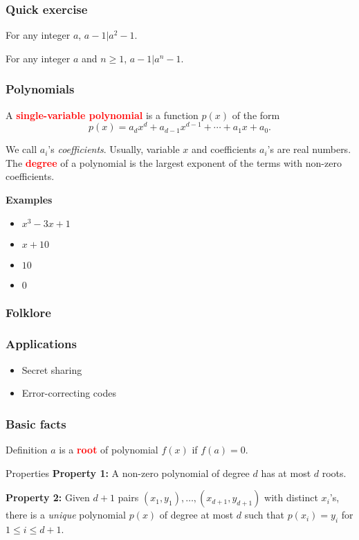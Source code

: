 

\begin{frame}
  \frametitle{Quick exercise} 

  For any integer $a$, $a-1|a^2-1$.

  \pause

  For any integer $a$ and $n\geq 1$, $a-1|a^n-1$.

  \vspace{3in}
\end{frame}

\begin{frame}
  \frametitle{Polynomials}

  A \textcolor{red}{\bf single-variable polynomial} is a function
  $p(x)$ of the form
  \[
  p(x) = a_dx^d+a_{d-1}x^{d-1}+\cdots+a_1x+a_0.
  \]

  We call $a_i$'s {\em coefficients}.  Usually, variable $x$ and
  coefficients $a_i$'s are real numbers.  The \textcolor{red}{\bf
    degree} of a polynomial is the largest exponent of the terms with
  non-zero coefficients.
  
  \vspace{0.2in}

  {\bf Examples}
  \begin{itemize}
  \item $x^3-3x+1$
  \item $x+10$
  \item $10$
  \item $0$
  \end{itemize}
\end{frame}

\begin{frame}
  \frametitle{Folklore}
\end{frame}

\begin{frame}
  \frametitle{Applications}
  \begin{itemize}
  \item Secret sharing
    \pause
  \item Error-correcting codes
  \end{itemize}
\end{frame}

\begin{frame}
  \frametitle{Basic facts}

  \begin{block}{Definition}
    $a$ is a \textcolor{red}{\bf root} of polynomial $f(x)$ if
    $f(a)=0$.
  \end{block}
  
  \begin{block}{Properties}
    {\bf Property 1:} A non-zero polynomial of degree $d$ has at most
    $d$ roots.

    {\bf Property 2:} Given $d+1$ pairs
    $(x_1,y_1),\ldots,(x_{d+1},y_{d+1})$ with distinct $x_i$'s, there
    is a {\em unique} polynomial $p(x)$ of degree at most $d$ such
    that $p(x_i)=y_i$ for $1\leq i\leq d+1$.
  \end{block}
\end{frame}

